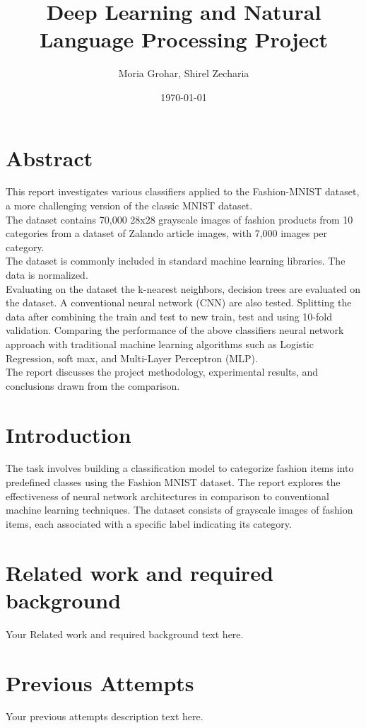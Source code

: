 \documentclass{article}
\title{Deep Learning and Natural Language Processing Project}
\author{Moria Grohar, Shirel Zecharia}
\date{\today}
\begin{document}
\maketitle

\section{Abstract}
This report investigates various classifiers applied to the Fashion-MNIST dataset, a more challenging version of the classic MNIST dataset.\\
The dataset contains 70,000 28x28 grayscale images of fashion products from 10 categories from a dataset of Zalando article images, with 7,000 images per category.\\
The dataset is commonly included in standard machine learning libraries. The data is normalized. \\
Evaluating on the dataset the k-nearest neighbors, decision trees are evaluated on the dataset. A conventional neural network (CNN) are also tested.
Splitting the data after combining the train and test to new train, test and using 10-fold validation.
Comparing the performance of the above classifiers neural network approach with traditional machine learning algorithms such as Logistic Regression, soft max, and Multi-Layer Perceptron (MLP).\\
The report discusses the project methodology, experimental results, and conclusions drawn from the comparison.
 
\section{Introduction}
The task involves building a classification model to categorize fashion items into predefined classes using the Fashion MNIST dataset.
The report explores the effectiveness of neural network architectures in comparison to conventional machine learning techniques. The dataset consists of grayscale images of fashion items, each associated with a specific label indicating its category.


\section{Related work and required background}  
Your Related work and required background text here.

\section{Previous Attempts}
Your previous attempts description text here.
\end{document}
